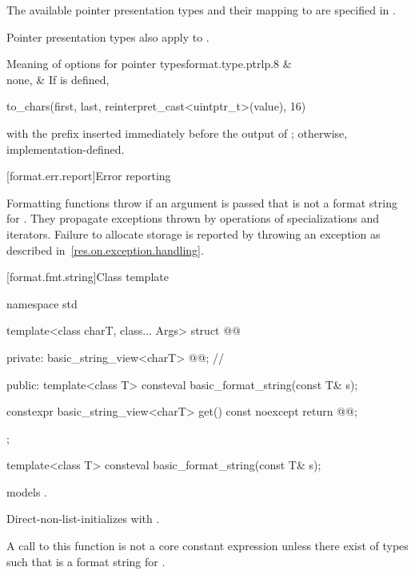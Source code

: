 \pnum
The available pointer presentation types and their mapping to
 are specified in .
\begin{note}
Pointer presentation types also apply to .
\end{note}

\begin{floattable}{Meaning of  options for pointer types}{format.type.ptr}{lp{.8\hsize}}
\topline
{} &  \\ \rowsep
none,  &
If  is defined,
\begin{codeblock}
to_chars(first, last, reinterpret_cast<uintptr_t>(value), 16)
\end{codeblock}
with the prefix  inserted immediately before the output of ;
otherwise, implementation-defined.
\\
\end{floattable}

[format.err.report]{Error reporting}

\pnum
Formatting functions throw  if
an argument  is passed that
is not a format string for .
They propagate exceptions thrown by operations of
 specializations and iterators.
Failure to allocate storage is reported by
throwing an exception as described in~\ref{res.on.exception.handling}.

[format.fmt.string]{Class template }

\begin{codeblock}
namespace std {
  template<class charT, class... Args>
  struct @@ {
  private:
    basic_string_view<charT> @@;         // \expos

  public:
    template<class T> consteval basic_format_string(const T& s);

    constexpr basic_string_view<charT> get() const noexcept { return @@; }
  };
}
\end{codeblock}

\begin{itemdecl}
template<class T> consteval basic_format_string(const T& s);
\end{itemdecl}

\begin{itemdescr}
\pnum
\constraints
{} models .

\pnum
\effects
Direct-non-list-initializes  with .

\pnum
\remarks
A call to this function is not a core constant expression
unless there exist  of types 
such that  is a format string for .
\end{itemdescr}

